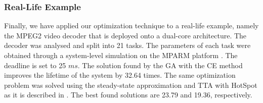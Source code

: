\subsubsection{Real-Life Example}
Finally, we have applied our optimization technique to a real-life example, namely the MPEG2 video decoder \cite{ffmpeg2011} that is deployed onto a dual-core architecture. The decoder was analysed and split into 21 tasks. The parameters of each task were obtained through a system-level simulation on the MPARM platform \cite{benini2005}. The deadline is set to 25 $ms$. The solution found by the GA with the CE method improves the lifetime of the system by 32.64 times. The same optimization problem was solved using the steady-state approximation and TTA with HotSpot as it is described in . The best found solutions are 23.79 and 19.36, respectively.
